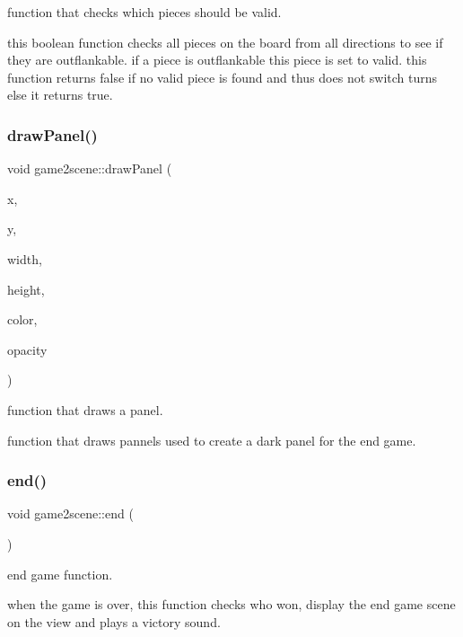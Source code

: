 function that checks which pieces should be valid. 

this boolean function checks all pieces on the board from all directions to see if they are outflankable. if a piece is outflankable this piece is set to valid. this function returns false if no valid piece is found and thus does not switch turns else it returns true. \mbox{\label{classgame2scene_a507687b5f74b925022c7a43749cf6607}} 
\subsubsection{\texorpdfstring{draw\+Panel()}{drawPanel()}}
{\footnotesize\ttfamily void game2scene\+::draw\+Panel (\begin{DoxyParamCaption}\item[{int}]{x,  }\item[{int}]{y,  }\item[{int}]{width,  }\item[{int}]{height,  }\item[{Q\+Color}]{color,  }\item[{double}]{opacity }\end{DoxyParamCaption})}



function that draws a panel. 

function that draws pannels used to create a dark panel for the end game. \mbox{\label{classgame2scene_a6ce6a4eaa445f93d88e48d2bf06b0a13}} 
\subsubsection{\texorpdfstring{end()}{end()}}
{\footnotesize\ttfamily void game2scene\+::end (\begin{DoxyParamCaption}{ }\end{DoxyParamCaption})}



end game function. 

when the game is over, this function checks who won, display the end game scene on the view and plays a victory sound. \mbox{\label{classgame2scene_a62c522d6732ff2a4889ba59ccc74f0dc}} 
